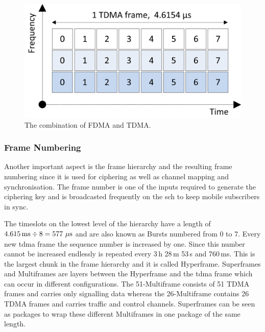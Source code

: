 \begin{figure}
	\centering
	\includegraphics{../Images/TDMAFDMA}
	\caption{The combination of FDMA and TDMA.}
	\label{fig:fdma_tdma}
\end{figure}

\subsubsection{Frame Numbering}
Another important aspect is the frame hierarchy and the resulting frame numbering since it is used for ciphering as well as channel mapping and synchronisation.
The frame number is one of the inputs required to generate the ciphering key and is broadcasted frequently on the \gls{sch} to keep mobile subscribers in sync.

The timeslots  on the lowest level of the hierarchy have a length of $4.615\text{\,ms} \div 8 = 577~\mu\text{s}$ and are also known as Bursts numbered from 0 to 7.
Every new \gls{tdma} frame the sequence number is increased by one.
Since this number cannot be increased endlessly is repeated every 3\,h 28\,m 53\,s and 760\,ms.
This is the largest chunk in the frame hierarchy and it is called Hyperframe.
Superframes and Multiframes are layers between the Hyperframe and the \gls{tdma} frame which can occur in different configurations.
The 51-Multiframe consists of 51 TDMA frames and carries only signalling data whereas the 26-Multiframe contains 26 TDMA frames and carries traffic and control channels.
Superframes can be seen as packages to wrap these different Multiframes in one package of the same length.

